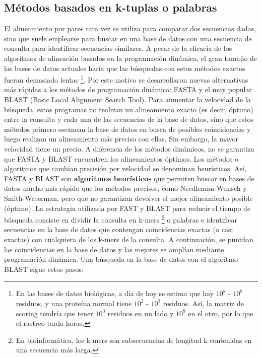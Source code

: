 \subsection{Métodos basados en k-tuplas o palabras} %
El alineamiento por pares rara vez se utiliza para comparar dos secuencias dadas, sino que suele emplearse para buscar en una base de datos con una secuencia de consulta para identificar secuencias similares. A pesar de la eficacia de los algoritmos de alineación basados en la programación dinámica, el gran tamaño de las bases de datos actuales haría que las búsquedas con estos métodos exactos fueran demasiado lentas \footnote{En las bases de datos biológicas, a día de hoy se estima que hay $10^8$ - $10^9$ residuos, y una proteína normal tiene $10^2$ - $10^3$ residuos. Así, la matriz de scoring tendría que tener $10^3$ residuos en un lado y $10^8$ en el otro, por lo que el rastreo tarda horas.}. Por este motivo se desarrollaron nuevas alternativas más rápidas a los métodos de programación dinámica: FASTA y el muy popular BLAST (Basic Local Alignment Search Tool). Para aumentar la velocidad de la búsqueda, estos programas no realizan un alineamiento exacto (es decir, óptimo) entre la consulta y cada una de las secuencias de la base de datos, sino que estos métodos primero escanean la base de datos en busca de posibles coincidencias y luego realizan un alineamiento más preciso con ellas. Sin embargo, la mayor velocidad tiene un precio. A diferencia de los métodos dinámicos, no se garantiza que FASTA y BLAST encuentren los alineamientos óptimos. Los métodos o algoritmos que cambian precisión por velocidad se denominan heurísticos. Así, FASTA y BLAST son \textbf{algoritmos heurísticos} que permiten buscar en bases de datos mucho más rápido que los métodos precisos, como Needleman-Wunsch y Smith-Waterman, pero que no garantizan devolver el mejor alineamiento posible (óptimo). La estrategia utilizada por FAST y BLAST para reducir el tiempo de búsqueda consiste en dividir la consulta en k-mers \footnote{En bioinformática, los k-mers son subsecuencias de longitud k contenidas en una secuencia más larga.} o palabras e identificar secuencias en la base de datos que contengan coincidencias exactas (o casi exactas) con cualquiera de los k-mers de la consulta. A continuación, se puntúan las coincidencias en la base de datos y las mejores se amplían mediante programación dinámica.
Una búsqueda en la base de datos con el algoritmo BLAST sigue estos pasos:
